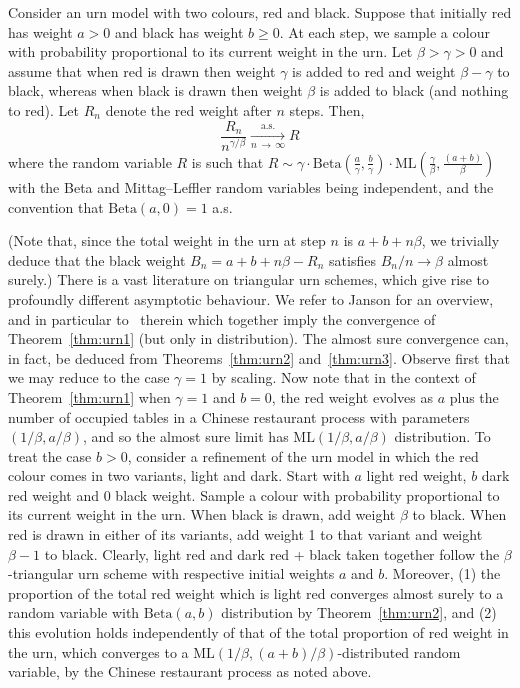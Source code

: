 \documentclass[AHL,Unicode,longabstracts,published]{cedram}
\newcommand{\Betal}{\mathrm{Beta}}
\newcommand{\ML}{\mathrm{ML}}
\begin{document}
\begin{theo}\label{thm:urn1}
Consider an urn model with two colours, red and black. Suppose that initially red has weight $a>0$ and black has weight $b \geq 0$. At each step, we sample a colour with probability proportional to its current weight in the urn. Let $\beta>\gamma > 0$ and assume that when red is drawn then weight $\gamma$ is added to red and weight $\beta-\gamma$ to black, whereas when black is drawn then weight $\beta$ is added to black (and nothing to red). Let $R_n$ denote the red weight after $n$ steps. Then,
\[
\frac{R_n}{n^{\gamma/\beta}} \underset{n\,\rightarrow\,\infty}{\overset{\text{a.s.}}\longrightarrow} R
\]
where the random variable $R$ is such that $R\sim \gamma \cdot \Betal(\frac{a}{\gamma},\frac{b}{\gamma})\cdot \ML\left(\frac{\gamma}{\beta},\frac{(a+b)}{\beta}\right)$ with the Beta and Mittag--Leffler random variables being independent, and the convention that $\Betal(a,0) = 1$ a.s.
\end{theo}

(Note that, since the total weight in the urn at step $n$ is $a + b + n\beta$, we trivially deduce that the black weight $B_n = a + b + n\beta -R_n$ satisfies $B_n/n \to \beta$ almost surely.) There is a vast literature on triangular urn schemes, which give rise to profoundly different asymptotic behaviour. We refer to Janson for an overview, and in particular to~\cite[Theorems~1.3 and 1.7]{Janson} therein which together imply the convergence of Theorem~\ref{thm:urn1} (but only in distribution). The almost sure convergence can, in fact, be deduced from Theorems~\ref{thm:urn2} and~\ref{thm:urn3}. Observe first that we may reduce to the case $\gamma = 1$ by scaling. Now note that in the context of Theorem~\ref{thm:urn1} when $\gamma=1$ and $b=0$, the red weight evolves as $a$ plus the number of occupied tables in a Chinese restaurant process with parameters $(1/\beta,a/\beta)$, and so the almost sure limit has $\ML(1/\beta,a/\beta)$ distribution. To treat the case $b > 0$, consider a refinement of the urn model in which the red colour comes in two variants, light and dark. Start with $a$ light red weight, $b$ dark red weight and 0 black weight. Sample a colour with probability proportional to its current weight in the urn. When black is drawn, add weight $\beta$ to black. When red is drawn in either of its variants, add weight 1 to that variant and weight $\beta-1$ to black. Clearly, light red and dark red + black taken together follow the $\beta$-triangular urn scheme with respective initial weights $a$ and $b$. Moreover, (1) the proportion of the total red weight which is light red converges almost surely to a random variable with $\Betal(a,b)$ distribution by Theorem~\ref{thm:urn2}, and (2) this evolution holds independently of that of the total proportion of red weight in the urn, which converges to a $\ML(1/\beta,(a+b)/\beta)$-distributed random variable, by the Chinese restaurant process as noted above.
\end{document}
